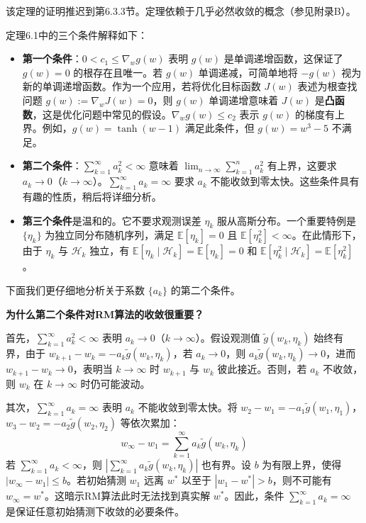 \documentclass[UTF8]{article}
\begin{document}
该定理的证明推迟到第6.3.3节。定理依赖于几乎必然收敛的概念（参见附录B）。

定理6.1中的三个条件解释如下：
\begin{itemize}
    \item \textbf{第一个条件}：$0 < c_1 \leq \nabla_w g(w)$ 表明 $g(w)$ 是单调递增函数，这保证了 $g(w) = 0$ 的根存在且唯一。若 $g(w)$ 单调递减，可简单地将 $-g(w)$ 视为新的单调递增函数。作为一个应用，若将优化目标函数 $J(w)$ 表述为根查找问题 $g(w) := \nabla_w J(w) = 0$，则 $g(w)$ 单调递增意味着 $J(w)$ 是\textbf{凸函数}，这是优化问题中常见的假设。$\nabla_w g(w) \leq c_2$ 表示 $g(w)$ 的梯度有上界。例如，$g(w) = \tanh(w - 1)$ 满足此条件，但 $g(w) = w^3 - 5$ 不满足。

    \item \textbf{第二个条件}：$\sum_{k=1}^{\infty} a_k^2 < \infty$ 意味着 $\lim_{n \to \infty} \sum_{k=1}^{n} a_k^2$ 有上界，这要求 $a_k \to 0$（$k \to \infty$）。$\sum_{k=1}^{\infty} a_k = \infty$ 要求 $a_k$ 不能收敛到零太快。这些条件具有有趣的性质，稍后将详细分析。

    \item \textbf{第三个条件}是温和的。它不要求观测误差 $\eta_k$ 服从高斯分布。一个重要特例是 $\{\eta_k\}$ 为独立同分布随机序列，满足 $\mathbb{E}[\eta_k] = 0$ 且 $\mathbb{E}[\eta_k^2] < \infty$。在此情形下，由于 $\eta_k$ 与 $\mathcal{H}_k$ 独立，有 $\mathbb{E}[\eta_k \mid \mathcal{H}_k] = \mathbb{E}[\eta_k] = 0$ 和 $\mathbb{E}[\eta_k^2 \mid \mathcal{H}_k] = \mathbb{E}[\eta_k^2]$。
\end{itemize}

下面我们更仔细地分析关于系数 $\{a_k\}$ 的第二个条件。

\textbf{为什么第二个条件对RM算法的收敛很重要？}

首先，$\sum_{k=1}^{\infty} a_k^2 < \infty$ 表明 $a_k \to 0$（$k \to \infty$）。假设观测值 $\tilde{g}(w_k, \eta_k)$ 始终有界，由于 $w_{k+1} - w_k = -a_k \tilde{g}(w_k, \eta_k)$，若 $a_k \to 0$，则 $a_k \tilde{g}(w_k, \eta_k) \to 0$，进而 $w_{k+1} - w_k \to 0$，表明当 $k \to \infty$ 时 $w_{k+1}$ 与 $w_k$ 彼此接近。否则，若 $a_k$ 不收敛，则 $w_k$ 在 $k \to \infty$ 时仍可能波动。

其次，$\sum_{k=1}^{\infty} a_k = \infty$ 表明 $a_k$ 不能收敛到零太快。将 $w_2 - w_1 = -a_1 \tilde{g}(w_1, \eta_1)$，$w_3 - w_2 = -a_2 \tilde{g}(w_2, \eta_2)$ 等依次累加：
\[
w_\infty - w_1 = \sum_{k=1}^{\infty} a_k \tilde{g}(w_k, \eta_k)
\]
若 $\sum_{k=1}^{\infty} a_k < \infty$，则 $|\sum_{k=1}^{\infty} a_k \tilde{g}(w_k, \eta_k)|$ 也有界。设 $b$ 为有限上界，使得 $|w_\infty - w_1| \leq b$。若初始猜测 $w_1$ 远离 $w^*$ 以至于 $|w_1 - w^*| > b$，则不可能有 $w_\infty = w^*$。这暗示RM算法此时无法找到真实解 $w^*$。因此，条件 $\sum_{k=1}^{\infty} a_k = \infty$ 是保证任意初始猜测下收敛的必要条件。
\end{document}
